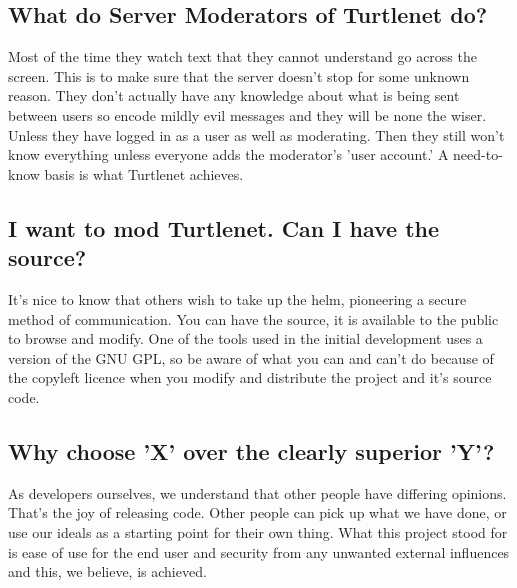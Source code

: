 \subsection{What do Server Moderators of Turtlenet do?}
Most of the time they watch text that they cannot understand go across the
screen.  This is to make sure that the server doesn't stop for some unknown 
reason.  They don't actually have any knowledge about what is being sent between
users so encode mildly evil messages and they will be none the wiser.  Unless
they have logged in as a user as well as moderating.  Then they still won't know
everything unless everyone adds the moderator's 'user account.'  A need-to-know
basis is what Turtlenet achieves.

\subsection{I want to mod Turtlenet.  Can I have the source?}
It's nice to know that others wish to take up the helm, pioneering a secure 
method of communication.  You can have the source, it is available to the public
to browse and modify.  One of the tools used in the initial development uses a
version of the GNU GPL, so be aware of what you can and can't do because of the
copyleft licence when you modify and distribute the project and it's source code.

\subsection{Why choose 'X' over the clearly superior 'Y'?}
As developers ourselves, we understand that other people have differing opinions.
That's the joy of releasing code.  Other people can pick up what we have done,
or use our ideals as a starting point for their own thing.  What this project
stood for is ease of use for the end user and security from any unwanted external
influences and this, we believe, is achieved.